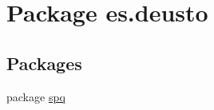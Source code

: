 \hypertarget{namespacees_1_1deusto}{}\section{Package es.\+deusto}
\label{namespacees_1_1deusto}
\subsection*{Packages}
\begin{DoxyCompactItemize}
\item 
package \mbox{\hyperlink{namespacees_1_1deusto_1_1spq}{spq}}
\end{DoxyCompactItemize}
